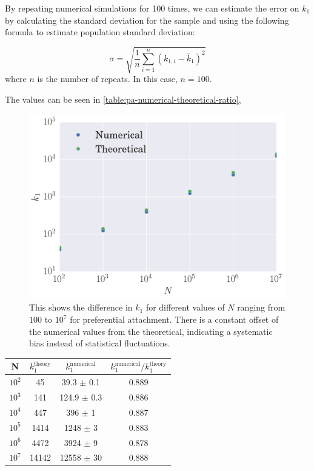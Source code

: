 By repeating numerical simulations for 100 times, we can estimate the error on $k_1$ by calculating the standard deviation for the sample and using the following formula to estimate population standard deviation:

\begin{equation}
	\sigma = \sqrt{\frac{1}{n} \sum_{i=1}^n (k_{1, i} - \bar{k}_1)^2}
	\label{eq:population-std}
\end{equation}
where $n$ is the number of repeats. In this case, $n = 100$. 

The values can be seen in \autoref{table:pa-numerical-theoretical-ratio}, 


\begin{figure}
    \centering
    \includegraphics[height=0.5\linewidth]{img/pa-numerical-theoretical-k1}
    \caption{This shows the difference in $k_1$ for different values of $N$ ranging from $100$ to $10^7$ for preferential attachment. There is a constant offset of the numerical values from the theoretical, indicating a systematic bias instead of statistical fluctuations. }
    \label{fig:pa-numerical-theoretical-k1}
\end{figure}

\begin{center}
\begin{tabular}{ ||c | c | c | c ||}
\hline
N & $k_1^{\text{theory}}$ & $k_1^{\text{numerical}}$ & $k_1^{\text{numerical}} / k_1^{\text{theory}} $\\ 
\hline
$10^2$ & 45    & 39.3  $\pm$ 0.1 & 0.889 \\  
$10^3$ & 141   & 124.9 $\pm$ 0.3 & 0.886 \\
$10^4$ & 447   & 396   $\pm$  1  & 0.887 \\
$10^5$ & 1414  & 1248  $\pm$  3  & 0.883 \\
$10^6$ & 4472  & 3924  $\pm$  9  & 0.878 \\
$10^7$ & 14142 & 12558 $\pm$ 30  & 0.888 \\  
\hline
\end{tabular}
\label{table:pa-numerical-theoretical-ratio}
\end{center}


